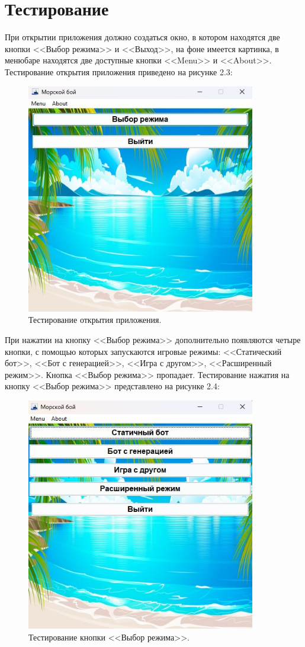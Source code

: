 \section{\label{sec:ch02/sec07}Тестирование}
При открытии приложения должно создаться окно, в котором находятся две кнопки <<Выбор режима>> и <<Выход>>, на фоне имеется картинка, в менюбаре находятся две доступные кнопки <<Menu>> и <<About>>. Тестирование открытия приложения приведено на рисунке 2.3:
\begin{figure}[H]
\graphicspath{ {img/} }
\centering
\includegraphics[width = 10cm]{главное окно.jpg}
\caption{Тестирование открытия приложения.}
\end{figure}
При нажатии на кнопку <<Выбор режима>> дополнительно появляются четыре кнопки, с помощью которых запускаются игровые режимы: <<Статический бот>>, <<Бот с генерацией>>, <<Игра с другом>>, <<Расширенный режим>>. Кнопка <<Выбор режима>> пропадает. Тестирование нажатия на кнопку <<Выбор режима>> представлено на рисунке 2.4:
\begin{figure}[H]
\graphicspath{ {img/} }
\centering
\includegraphics[width = 10cm]{Выбор режима.jpg}
\caption{Тестирование кнопки <<Выбор режима>>.}
\end{figure}
